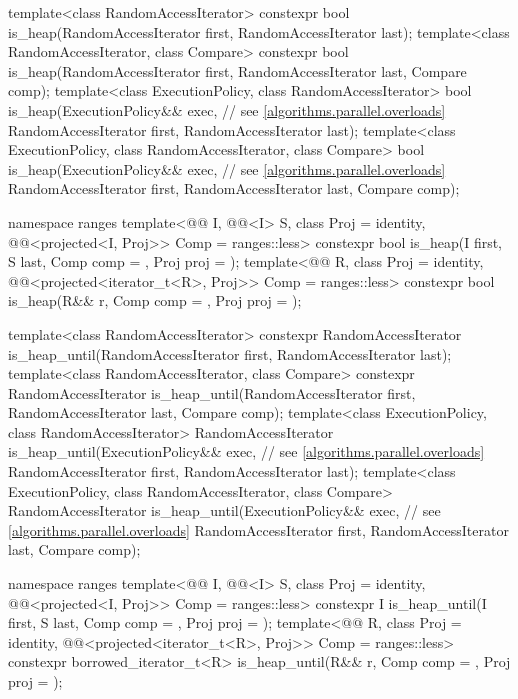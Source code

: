 \begin{codeblock}
{  template<class RandomAccessIterator>
    constexpr bool is_heap(RandomAccessIterator first, RandomAccessIterator last);
  template<class RandomAccessIterator, class Compare>
    constexpr bool is_heap(RandomAccessIterator first, RandomAccessIterator last,
                           Compare comp);
  template<class ExecutionPolicy, class RandomAccessIterator>
    bool is_heap(ExecutionPolicy&& exec,                        // see \ref{algorithms.parallel.overloads}
                 RandomAccessIterator first, RandomAccessIterator last);
  template<class ExecutionPolicy, class RandomAccessIterator, class Compare>
    bool is_heap(ExecutionPolicy&& exec,                        // see \ref{algorithms.parallel.overloads}
                 RandomAccessIterator first, RandomAccessIterator last,
                 Compare comp);

  namespace ranges {
    template<@@ I, @@<I> S, class Proj = identity,
             @@<projected<I, Proj>> Comp = ranges::less>
      constexpr bool is_heap(I first, S last, Comp comp = {}, Proj proj = {});
    template<@@ R, class Proj = identity,
             @@<projected<iterator_t<R>, Proj>> Comp = ranges::less>
      constexpr bool is_heap(R&& r, Comp comp = {}, Proj proj = {});
  }

  template<class RandomAccessIterator>
    constexpr RandomAccessIterator
      is_heap_until(RandomAccessIterator first, RandomAccessIterator last);
  template<class RandomAccessIterator, class Compare>
    constexpr RandomAccessIterator
      is_heap_until(RandomAccessIterator first, RandomAccessIterator last,
                    Compare comp);
  template<class ExecutionPolicy, class RandomAccessIterator>
    RandomAccessIterator
      is_heap_until(ExecutionPolicy&& exec,                     // see \ref{algorithms.parallel.overloads}
                    RandomAccessIterator first, RandomAccessIterator last);
  template<class ExecutionPolicy, class RandomAccessIterator, class Compare>
    RandomAccessIterator
      is_heap_until(ExecutionPolicy&& exec,                     // see \ref{algorithms.parallel.overloads}
                    RandomAccessIterator first, RandomAccessIterator last,
                    Compare comp);

  namespace ranges {
    template<@@ I, @@<I> S, class Proj = identity,
             @@<projected<I, Proj>> Comp = ranges::less>
      constexpr I is_heap_until(I first, S last, Comp comp = {}, Proj proj = {});
    template<@@ R, class Proj = identity,
             @@<projected<iterator_t<R>, Proj>> Comp = ranges::less>
      constexpr borrowed_iterator_t<R>
        is_heap_until(R&& r, Comp comp = {}, Proj proj = {});
  }

}
\end{codeblock}
